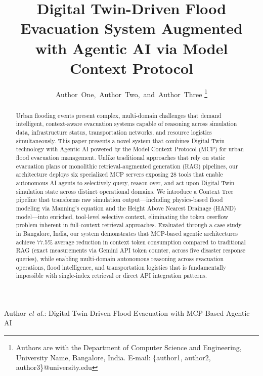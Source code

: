 \documentclass[journal]{IEEEtran}
\begin{document}
\title{Digital Twin-Driven Flood Evacuation System Augmented with Agentic AI via Model Context Protocol}

\author{
    Author~One,~Author~Two,~and~Author~Three%
    \thanks{Authors are with the Department of Computer Science and Engineering,
    University Name, Bangalore, India.
    E-mail: \{author1, author2, author3\}@university.edu}
}

%
{Author \MakeLowercase{\textit{et al.}}: Digital Twin-Driven Flood Evacuation with MCP-Based Agentic AI}

\maketitle

\begin{abstract}
Urban flooding events present complex, multi-domain challenges that demand
intelligent, context-aware evacuation systems capable of reasoning across
simulation data, infrastructure status, transportation networks, and resource
logistics simultaneously. This paper presents a novel system that combines
Digital Twin technology with Agentic AI powered by the Model Context Protocol
(MCP) for urban flood evacuation management. Unlike traditional approaches
that rely on static evacuation plans or monolithic retrieval-augmented
generation (RAG) pipelines, our architecture deploys six specialized MCP
servers exposing 28 tools that enable autonomous AI agents to selectively
query, reason over, and act upon Digital Twin simulation state across distinct
operational domains. We introduce a Context Tree pipeline that transforms raw
simulation output---including physics-based flood modeling via Manning's
equation and the Height Above Nearest Drainage (HAND) model---into enriched,
tool-level selective context, eliminating the token overflow problem inherent
in full-context retrieval approaches. Evaluated through a case study in
Bangalore, India, our system demonstrates that MCP-based agentic architectures
achieve 77.5\% average reduction in context token consumption compared to
traditional RAG (exact measurements via Gemini API token counter, across five disaster response queries), while enabling
multi-domain autonomous reasoning across evacuation operations, flood intelligence,
and transportation logistics that is fundamentally impossible with single-index
retrieval or direct API integration patterns.
\end{abstract}
\end{document}
